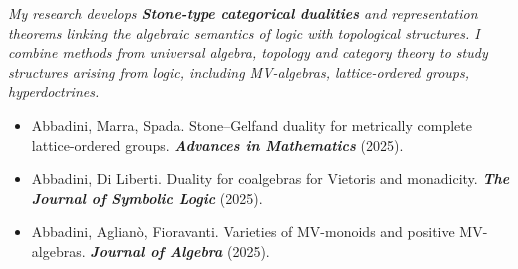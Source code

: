 {\begingroup
{} %

\makeatletter
\begingroup
\let\addcontentsline\@gobblethree

\textit{\small
My research develops \textbf{Stone-type categorical dualities} and representation theorems
linking the algebraic semantics of logic with topological structures.
I combine methods from universal algebra, topology and category theory to study structures arising from logic,
including MV-algebras, lattice-ordered groups, hyperdoctrines.
}





\vspace{0.6em}

\begin{minipage}[t]{0.48\textwidth}





\begin{itemize}
  \setlength\itemsep{0.25em}
  \setlength\parskip{0pt}
  \setlength\parsep{0pt}
  \item Abbadini, Marra, Spada.
        {Stone--Gelfand duality for metrically complete lattice-ordered groups}.
        \textbf{\emph{Advances in Mathematics}} (2025).
  \item Abbadini, Di Liberti.
        {Duality for coalgebras for Vietoris and monadicity}.
        \textbf{\emph{The Journal of Symbolic Logic}} (2025).
  \item Abbadini, Aglian\`o, Fioravanti.
        {Varieties of MV-monoids and positive MV-algebras}.
        \textbf{\emph{Journal of Algebra}} (2025).
\end{itemize}


\end{minipage}}
